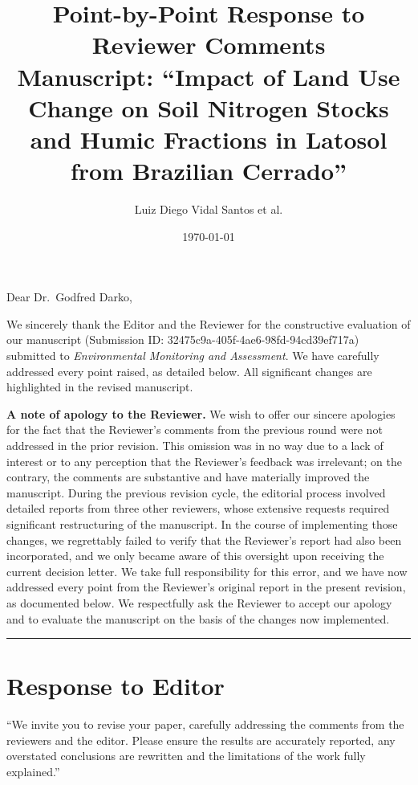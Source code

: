 \documentclass[11pt,a4paper]{article}
\title{Point-by-Point Response to Reviewer Comments\\[0.3em]
\large Manuscript: ``Impact of Land Use Change on Soil Nitrogen Stocks\\
and Humic Fractions in Latosol from Brazilian Cerrado''}
\author{Luiz Diego Vidal Santos et al.}
\date{\today}
\begin{document}
\maketitle

\noindent Dear Dr.\ Godfred Darko,

\medskip
\noindent We sincerely thank the Editor and the Reviewer for the constructive evaluation of our manuscript (Submission ID: 32475c9a-405f-4ae6-98fd-94cd39ef717a) submitted to \textit{Environmental Monitoring and Assessment}. We have carefully addressed every point raised, as detailed below. All significant changes are highlighted in the revised manuscript.

\medskip
\noindent \textbf{A note of apology to the Reviewer.} We wish to offer our sincere apologies for the fact that the Reviewer's comments from the previous round were not addressed in the prior revision. This omission was in no way due to a lack of interest or to any perception that the Reviewer's feedback was irrelevant; on the contrary, the comments are substantive and have materially improved the manuscript. During the previous revision cycle, the editorial process involved detailed reports from three other reviewers, whose extensive requests required significant restructuring of the manuscript. In the course of implementing those changes, we regrettably failed to verify that the Reviewer's report had also been incorporated, and we only became aware of this oversight upon receiving the current decision letter. We take full responsibility for this error, and we have now addressed every point from the Reviewer's original report in the present revision, as documented below. We respectfully ask the Reviewer to accept our apology and to evaluate the manuscript on the basis of the changes now implemented.

\bigskip
\hrule
\bigskip

\section*{Response to Editor}

\begin{editorbox}
``We invite you to revise your paper, carefully addressing the comments from the reviewers and the editor. Please ensure the results are accurately reported, any overstated conclusions are rewritten and the limitations of the work fully explained.''
\end{editorbox}
\end{document}
